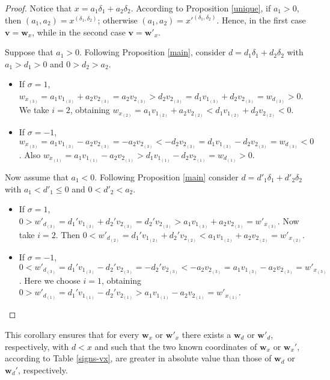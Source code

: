 \documentclass[11pt]{amsart}
\theoremstyle{remark}
\begin{document}
\begin{proof}

Notice that $x=a_1\delta_1+a_2\delta_2$. According to Proposition \ref{unique}, if $a_1>0$, then $(a_1,a_2)=x^{(\delta_1,\delta_2)}$;  otherwise $(a_1,a_2)=x'^{(\delta_1,\delta_2)}$. Hence, in the first case $\mathbf v=\mathbf w_x$, while in the second case $\mathbf v=\mathbf w'_x$. 


Suppose that $a_1>0$. Following Proposition \ref{main}, consider $d=d_1\delta_1+d_2\delta_2$ with $a_1>d_1> 0$ and $0>d_2>a_2$. 

\begin{itemize}
\item If $\sigma=1$, $w_{x_{(3)}}=a_1 v_{1_{(3)}}+a_2v_{2_{(3)}}=a_2v_{2_{(3)}}>d_2v_{2_{(3)}}=d_1v_{1_{(3)}}+d_2v_{2_{(3)}}=w_{d_{(3)}}>0$. We take $i=2$, obtaining $w_{x_{(2)}}=a_1 v_{1_{(2)}}+a_2v_{2_{(2)}}<d_1v_{1_{(2)}}+d_2v_{2_{(2)}}<0$.

\item If $\sigma=-1$, $w_{x_{(3)}}=a_1 v_{1_{(3)}}-a_2v_{2_{(3)}}=-a_2v_{2_{(3)}}<-d_2v_{2_{(3)}}=d_1v_{1_{(3)}}-d_2v_{2_{(3)}}=w_{d_{(3)}}<0$. Also  $w_{x_{(1)}}=a_1 v_{1_{(1)}}-a_2v_{2_{(1)}}>d_1v_{1_{(1)}}-d_2v_{2_{(1)}}=w_{d_{(1)}}>0$.
\end{itemize}

Now assume that $a_1<0$. Following Proposition \ref{main} consider $d=d'_1\delta_1+d'_2\delta_2$ with $a_1<d'_1\le 0$ and $0<d'_2<a_2$.%

\begin{itemize}
\item If $\sigma=1$, $0>w'_{d_{(3)}}= d_1'v_{1_{(3)}}+d_2'v_{2_{(3)}}=d_2'v_{2_{(3)}}>a_1v_{1_{(3)}}+a_2v_{2_{(3)}}=w'_{x_{(3)}}$. Now take $i=2$. Then $0<w'_{d_{(2)}}= d_1'v_{1_{(2)}}+d_2'v_{2_{(2)}}<a_1v_{1_{(2)}}+a_2v_{2_{(2)}}=w'_{x_{(2)}}$. 

\item If $\sigma=-1$, $0<w'_{d_{(3)}}= d_1'v_{1_{(3)}}-d_2'v_{2_{(3)}}=-d_2'v_{2_{(3)}}<-a_2v_{2_{(3)}}=a_1v_{1_{(3)}}-a_2v_{2_{(3)}}=w'_{x_{(3)}}$. Here we choose $i=1$, obtaining $0>w'_{d_{(1)}}=d_1'v_{1_{(1)}}-d_2'v_{2_{(1)}}>a_1v_{1_{(1)}}-a_2v_{2_{(1)}}=w'_{x_{(1)}}$.\qedhere
\end{itemize}

\end{proof}

This corollary ensures that for every $\mathbf w_x$ or $\mathbf w'_x$ there exists a  $\mathbf w_d$ or $\mathbf w'_d$, respectively, with $d<x$ and such that the two known coordinates of  $\mathbf w_x$ or $\mathbf w_x'$, according to Table \ref{signs-vx}, are greater in absolute value than those of $\mathbf w_d$ or $\mathbf w_d'$, respectively.
\end{document}
